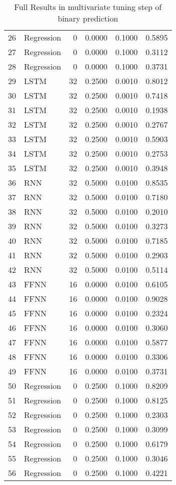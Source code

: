 \begin{table}[ht]
\begin{tabular}{rlrrrr}
  26 & Regression &     0 & 0.0000 & 0.1000 & 0.5895 \\ 
  27 & Regression &     0 & 0.0000 & 0.1000 & 0.3112 \\ 
  28 & Regression &     0 & 0.0000 & 0.1000 & 0.3731 \\ 
  29 & LSTM &    32 & 0.2500 & 0.0010 & 0.8012 \\ 
  30 & LSTM &    32 & 0.2500 & 0.0010 & 0.7418 \\ 
  31 & LSTM &    32 & 0.2500 & 0.0010 & 0.1938 \\ 
  32 & LSTM &    32 & 0.2500 & 0.0010 & 0.2767 \\ 
  33 & LSTM &    32 & 0.2500 & 0.0010 & 0.5903 \\ 
  34 & LSTM &    32 & 0.2500 & 0.0010 & 0.2753 \\ 
  35 & LSTM &    32 & 0.2500 & 0.0010 & 0.3948 \\ 
  36 & RNN &    32 & 0.5000 & 0.0100 & 0.8535 \\ 
  37 & RNN &    32 & 0.5000 & 0.0100 & 0.7180 \\ 
  38 & RNN &    32 & 0.5000 & 0.0100 & 0.2010 \\ 
  39 & RNN &    32 & 0.5000 & 0.0100 & 0.3273 \\ 
  40 & RNN &    32 & 0.5000 & 0.0100 & 0.7185 \\ 
  41 & RNN &    32 & 0.5000 & 0.0100 & 0.2903 \\ 
  42 & RNN &    32 & 0.5000 & 0.0100 & 0.5114 \\ 
  43 & FFNN &    16 & 0.0000 & 0.0100 & 0.6105 \\ 
  44 & FFNN &    16 & 0.0000 & 0.0100 & 0.9028 \\ 
  45 & FFNN &    16 & 0.0000 & 0.0100 & 0.2324 \\ 
  46 & FFNN &    16 & 0.0000 & 0.0100 & 0.3060 \\ 
  47 & FFNN &    16 & 0.0000 & 0.0100 & 0.5877 \\ 
  48 & FFNN &    16 & 0.0000 & 0.0100 & 0.3306 \\ 
  49 & FFNN &    16 & 0.0000 & 0.0100 & 0.3731 \\ 
  50 & Regression &     0 & 0.2500 & 0.1000 & 0.8209 \\ 
  51 & Regression &     0 & 0.2500 & 0.1000 & 0.8125 \\ 
  52 & Regression &     0 & 0.2500 & 0.1000 & 0.2303 \\ 
  53 & Regression &     0 & 0.2500 & 0.1000 & 0.3099 \\ 
  54 & Regression &     0 & 0.2500 & 0.1000 & 0.6179 \\ 
  55 & Regression &     0 & 0.2500 & 0.1000 & 0.3046 \\ 
  56 & Regression &     0 & 0.2500 & 0.1000 & 0.4221 \\ 
   \hline
\end{tabular}
\caption{Full Results in multivariate tuning step of binary prediction} 
\label{tab:binary.multivar.par.tuning.full}
\end{table}
